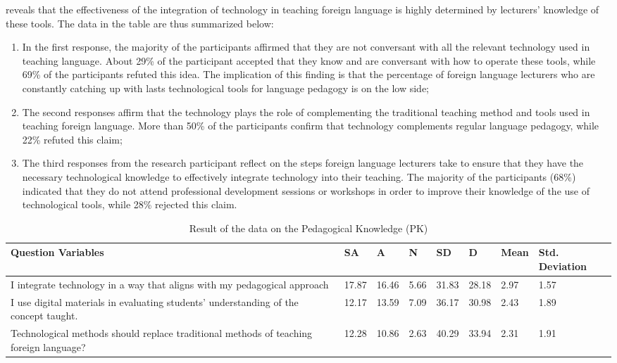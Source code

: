 \documentclass[english]{textolivre}
\begin{document}
 reveals that the effectiveness of the integration of technology in teaching foreign language is highly determined by lecturers’ knowledge of these tools. The data in the table are thus summarized below:

\begin{enumerate}
    \item In the first response, the majority of the participants affirmed that they are not conversant with all the relevant technology used in teaching language. About 29\% of the participant accepted that they know and are conversant with how to operate these tools, while 69\% of the participants refuted this idea. The implication of this finding is that the percentage of foreign language lecturers who are constantly catching up with lasts technological tools for language pedagogy is on the low side;
    \item The second responses affirm that the technology plays the role of complementing the traditional teaching method and tools used in teaching foreign language. More than 50\% of the participants confirm that technology complements regular language pedagogy, while 22\% refuted this claim;
    \item The third responses from the research participant reflect on the steps foreign language lecturers take to ensure that they have the necessary technological knowledge to effectively integrate technology into their teaching. The majority of the participants (68\%) indicated that they do not attend professional development sessions or workshops in order to improve their knowledge of the use of technological tools, while 28\% rejected this claim.
\end{enumerate}

\begin{table}[h!]
\centering
\begin{threeparttable}
\caption{Result of the data on the Pedagogical Knowledge (PK)}
\label{tab4}
\begin{tabular}{p{5cm}lllllll}
\toprule
Question Variables & SA & A & N & SD & D & Mean & Std. Deviation \\ 
\midrule
I integrate technology in a way that aligns with my pedagogical approach & 17.87 & 16.46 & 5.66 & 31.83 & 28.18 & 2.97 & 1.57 \\
I use digital materials in evaluating students’ understanding of the concept taught. & 12.17 & 13.59 & 7.09 & 36.17 & 30.98 & 2.43 & 1.89 \\
Technological methods should replace traditional methods of teaching foreign language? & 12.28 & 10.86 & 2.63 & 40.29 & 33.94 & 2.31 & 1.91 \\
\midrule
\end{tabular}
\end{threeparttable}
\end{table}
\end{document}
